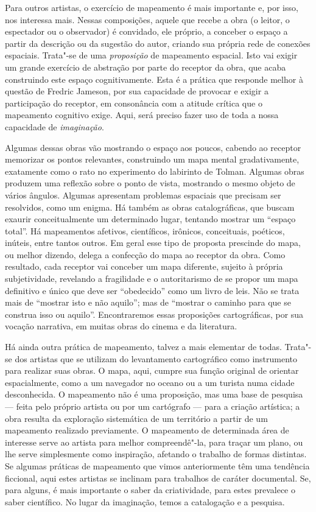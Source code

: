 Para outros artistas, o exercício de mapeamento é mais importante e, por
isso, nos interessa mais. Nessas composições, aquele que recebe a obra (o
leitor, o espectador ou o observador) é convidado, ele próprio, a
conceber o espaço a partir da descrição ou da sugestão do autor, criando
sua própria rede de conexões espaciais. Trata"-se de uma
\emph{proposição} de mapeamento espacial. Isto vai exigir um
grande exercício de abstração por parte do receptor da obra, que acaba
construindo este espaço cognitivamente. Esta é a prática que responde
melhor à questão de Fredric Jameson, por sua capacidade de provocar e
exigir a participação do receptor, em consonância com a atitude crítica
que o mapeamento cognitivo exige. Aqui, será preciso fazer uso de toda a
nossa capacidade de \emph{imaginação}.

Algumas dessas obras vão mostrando o espaço aos poucos, cabendo ao
receptor memorizar os pontos relevantes, construindo um mapa mental
gradativamente, exatamente como o rato no experimento do labirinto de
Tolman. Algumas obras produzem uma reflexão sobre o ponto de vista,
mostrando o mesmo objeto de vários ângulos. Algumas apresentam problemas
espaciais que precisam ser resolvidos, como um enigma. Há também as
obras catalográficas, que buscam exaurir conceitualmente um determinado
lugar, tentando mostrar um ``espaço total''. Há mapeamentos afetivos,
científicos, irônicos, conceituais, poéticos, inúteis, entre tantos
outros. Em geral esse tipo de proposta prescinde do mapa, ou melhor
dizendo, delega a confecção do mapa ao receptor da obra. Como resultado,
cada receptor vai conceber um mapa diferente, sujeito à própria
subjetividade, revelando a fragilidade e o autoritarismo de se propor um
mapa definitivo e único que deve ser ``obedecido'' como um livro de
leis. Não se trata mais de ``mostrar isto e não aquilo''; mas de
``mostrar o caminho para que se construa isso ou aquilo''. Encontraremos
essas proposições cartográficas, por sua vocação narrativa, em muitas
obras do cinema e da literatura.

Há ainda outra prática de mapeamento, talvez a mais elementar de todas.
Trata"-se dos artistas que se utilizam do levantamento cartográfico como
instrumento para realizar suas obras. O mapa, aqui, cumpre sua função
original de orientar espacialmente, como a um navegador no oceano ou a
um turista numa cidade desconhecida. O mapeamento não é uma proposição,
mas uma base de pesquisa --- feita pelo próprio artista ou por um
cartógrafo --- para a criação artística; a obra resulta da exploração
sistemática de um território a partir de um mapeamento realizado
previamente. O mapeamento de determinada área de interesse serve ao
artista para melhor compreendê"-la, para traçar um plano, ou lhe serve
simplesmente como inspiração, afetando o trabalho de formas distintas.
Se algumas práticas de mapeamento que vimos anteriormente têm uma
tendência ficcional, aqui estes artistas se inclinam para trabalhos de
caráter documental. Se, para alguns, é mais importante o saber da
criatividade, para estes prevalece o saber científico. No lugar da
imaginação, temos a catalogação e a pesquisa.

